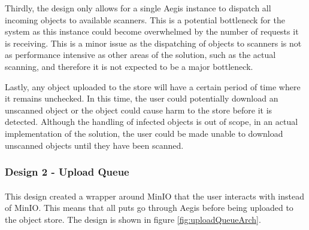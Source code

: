 \documentclass[12pt, conference, final, a4paper, onecolumn, compsoc]{IEEEtran}
\begin{document}
    Thirdly, the design only allows for a single Aegis instance to dispatch all
    incoming objects to available scanners. This is a potential bottleneck for
    the system as this instance could become overwhelmed by the number of
    requests it is receiving. This is a minor issue as the dispatching of
    objects to scanners is not as performance intensive as other areas of the
    solution, such as the actual scanning, and therefore it is not expected to
    be a major bottleneck.

    Lastly, any object uploaded to the store will have a certain period of time
    where it remains unchecked. In this time, the user could potentially
    download an unscanned object or the object could cause harm to the store
    before it is detected. Although the handling of infected objects is out of
    scope, in an actual implementation of the solution, the user could be made
    unable to download unscanned objects until they have been scanned.


    \subsubsection*{Design 2 - Upload Queue}
    \paragraph{}

    This design created a wrapper around MinIO that the user interacts with
    instead of MinIO. This means that all puts go through Aegis before being
    uploaded to the object store. The design is shown in figure
    \ref{fig:uploadQueueArch}.
\end{document}
